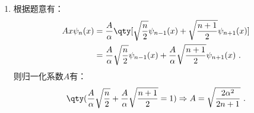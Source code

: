 
\begin{issues}
\issueDraft
\end{issues}

\subsection{ }
\begin{enumerate}
\item 根据题意有：
\begin{equation}
\begin{aligned}
Ax\psi_n(x)&=\frac{A}{\alpha}\qty[\sqrt{\frac{n}{2}}\psi_{n-1}(x)+\sqrt{\frac{n+1}{2}}\psi_{n+1}(x)] \\
&=\frac{A}{\alpha}\sqrt{\frac{n}{2}}\psi_{n-1}(x)+\frac{A}{\alpha}\sqrt{\frac{n+1}{2}}\psi_{n+1}(x)~.
\end{aligned}
\end{equation}
则归一化系数$A$有：
\begin{equation}
\qty(\frac{A}{\alpha}\sqrt{\frac{n}{2}}+\frac{A}{\alpha}\sqrt{\frac{n+1}{2}}=1)\Rightarrow A=\sqrt{\frac{2\alpha^2}{2n+1}}~.
\end{equation}
\end{enumerate}
\subsection{ }
